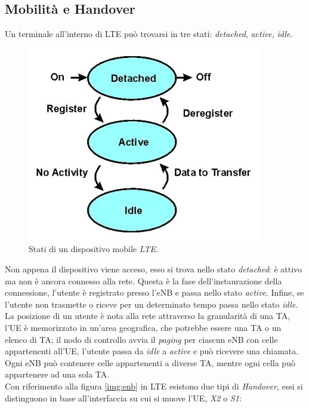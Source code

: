  \subsection{Mobilità e Handover}
 Un terminale all'interno di \ac{LTE} può trovarsi in tre stati: \emph{detached}, \emph{active}, \emph{idle}.
 \begin{figure}[!h]
 \includegraphics[scale=0.5]{Immagini/ltestatus}
 \centering 
 \caption{Stati di un dispositivo mobile \emph{LTE}.}
 \end{figure}
 Non appena il dispositivo viene acceso, esso si trova nello stato \emph{detached}: è attivo ma non è ancora connesso alla rete. Questa
 è la fase dell'instaurazione della connessione, l'utente è registrato presso l'eNB e passa nello stato \emph{active}. Infine, se l'utente
 non trasmette o riceve per un determinato tempo passa nello stato \emph{idle}. \\
 La posizione di un utente è nota alla rete attraverso la granularità di una \ac{TA}, l'\ac{UE} è memorizzato in un'area geografica, che
 potrebbe essere una \ac{TA} o un elenco di \ac{TA}; il nodo di controllo avvia il \emph{paging} per ciascun \ac{eNB} con celle 
 appartenenti all'\ac{UE}, l'utente passa da \emph{idle} a \emph{active} e può ricevere una chiamata. Ogni \ac{eNB} può contenere celle 
 appartenenti a diverse \ac{TA}, mentre ogni cella può appartenere ad una sola \ac{TA}. \\
 Con riferimento alla figura \ref{img:enb} in \ac{LTE} esistono due tipi di \emph{Handover}, essi si distinguono in base all'interfaccia su
 cui si muove l'\ac{UE}, \emph{X2} o \emph{S1}:
